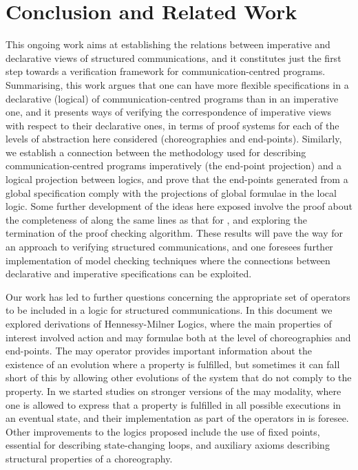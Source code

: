 \section{Conclusion and Related Work}
\label{Logic4Struct:sec:conclusion}

This ongoing work aims at establishing the relations between imperative and declarative views of structured
communications, and it  constitutes just the first step towards a
verification framework for communication-centred programs. Summarising,
this work argues that one can have more flexible specifications in a declarative
(logical) of communication-centred programs than in an
imperative one, and it presents ways of verifying the correspondence
of imperative views with respect to their declarative ones, in terms of
proof systems for each of the levels of abstraction here considered
(choreographies and end-points). Similarly, we establish a connection
between the methodology used for describing communication-centred
programs imperatively (the end-point projection) and a logical
projection between logics, and prove that the end-points generated
from a global specification comply with the projections of global
formulae in the local logic. Some further development of the ideas
here exposed involve the proof about the completeness of \LL along the same lines as that for \GL, and exploring the termination of the
proof checking algorithm. These results will pave the way for an approach to verifying structured communications, and one foresees further
implementation of model checking techniques where the connections
between declarative and imperative specifications can be exploited.




Our work has led to further questions concerning the appropriate set
of operators to be included in a logic for structured
communications. In this document we explored derivations of
Hennessy-Milner Logics, where the main properties of interest involved
action and may formulae both at the level of choreographies and
end-points. The may operator provides important information about the
existence of an evolution where a property is fulfilled, but sometimes
it can fall short of this  by allowing other evolutions of the system that do
not comply to the property. In \cite{Carbone2011Open-Mixed-Refi} we
started studies on stronger versions of the may modality, where one is
allowed to express that a property is fulfilled in all possible
executions in an eventual state, and their implementation as part of
the operators in \GL is foresee.  Other improvements to the logics
proposed include the use of fixed points, essential for describing
state-changing loops, and auxiliary axioms describing structural
properties of a choreography.



